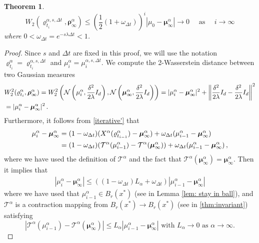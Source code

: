 \documentclass[reqno]{amsart}
\numberwithin{algorithm}{section}
\newcommand{\Xalpha}{{X^\alpha}}
\newcommand{\mTa}{{\mathcal T}^\alpha}
\newcommand{\mc}[1]{\mathcal{#1}}
\newtheorem{theorem}{Theorem}[section]
\begin{document}
{\begin{theorem}
\begin{equation}
   W_2(\varrho_{t_i}^{\alpha,s,\Delta t},\boldsymbol\rho_\infty^\alpha)\leq \left(\frac{1}{2}(1+\omega_{\Delta t})\right)^i |\mu_0-\boldsymbol\mu_\infty^\alpha|\to 0\quad \mbox{ as }\quad i\to \infty 
\end{equation}
where $0<\omega_{\Delta t}=e^{-s\lambda \Delta t}<1$.
\end{theorem}
\begin{proof}
 Since $s$ and $\Delta t$ are fixed in this proof, we will use the notation $\varrho_{t_i}^{\alpha} = \varrho_{t_i}^{\alpha,s,\Delta t}$ and $\mu_{i}^{\alpha}=\mu_i^{\alpha,s,\Delta t}$.
   We compute the 2-Wasserstein distance between two Gaussian measures
   \begin{align}
&W_2^2(\varrho_{t_i}^{\alpha},\boldsymbol\rho_\infty^\alpha)=W_2^2\left(\mc{N}\left(\mu_i^\alpha,\frac{\delta^2}{2\lambda}I_d\right),\mc{N}\left(\boldsymbol\mu_\infty^\alpha,\frac{\delta^2}{2\lambda}I_d\right)\right)=|\mu_i^\alpha-\boldsymbol\mu_\infty^\alpha|^2+\left\|\frac{\delta^2}{2\lambda}I_d-\frac{\delta^2}{2\lambda}I_d\right\|^2 \notag \\
&=|\mu_i^\alpha-\boldsymbol\mu_\infty^\alpha|^2\,.
   \end{align}
Furthermore, it follows from \eqref{iterative'} that
\begin{align}
    \mu_i^\alpha-\boldsymbol\mu_\infty^\alpha&= (1-\omega_{\Delta t})(\Xalpha(\varrho_{t_{i-1}}^{\alpha})-\boldsymbol\mu_\infty^\alpha)+\omega_{\Delta t}(\mu_{i-1}^\alpha-\boldsymbol\mu_\infty^\alpha)\notag\\
    &=(1-\omega_{\Delta t})(\mTa(\mu_{i-1}^\alpha)-\mTa(\boldsymbol\mu_\infty^\alpha))+\omega_{\Delta t}(\mu_{i-1}^\alpha-\boldsymbol\mu_\infty^\alpha)\,,
\end{align}
where we have used the definition of $\mTa$ and the fact that $\mTa(\boldsymbol\mu_\infty^\alpha)=\boldsymbol\mu_\infty^\alpha$. Then it implies that
\begin{align}
 |\mu_i^\alpha-\boldsymbol\mu_\infty^\alpha|\leq  \left((1-\omega_{\Delta t})L_\alpha+\omega_{\Delta t}\right)|\mu_{i-1}^\alpha-\boldsymbol\mu_\infty^\alpha| 
\end{align}
where we have used that $\mu_{i-1}^\alpha\in B_r(x^*)$ (see in Lemma \ref{lem: stay in ball}), and
$\mTa$ is a contraction mapping from $B_r(x^*)\to B_r(x^*)$ (see in \cref{thm:invariant}) satisfying
\begin{equation}
    |\mTa(\mu_{i-1}^\alpha)-\mTa(\boldsymbol\mu_\infty^\alpha)|\leq L_\alpha |\mu_{i-1}^\alpha-\boldsymbol\mu_\infty^\alpha| \mbox{ with } L_\alpha\to 0 \mbox{ as }\alpha \to\infty.

\end{equation}
\end{proof}}
\end{document}
